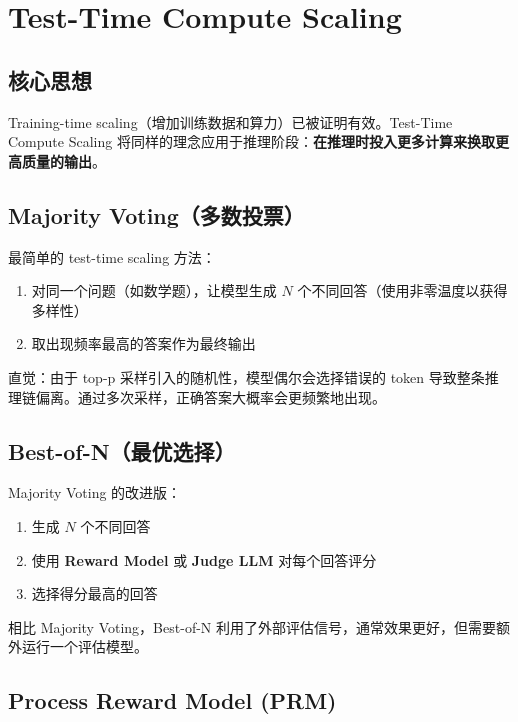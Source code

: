 \section{Test-Time Compute Scaling}

\subsection{核心思想}

Training-time scaling（增加训练数据和算力）已被证明有效。Test-Time Compute Scaling 将同样的理念应用于推理阶段：\textbf{在推理时投入更多计算来换取更高质量的输出}。

\subsection{Majority Voting（多数投票）}

最简单的 test-time scaling 方法：

\begin{enumerate}
    \item 对同一个问题（如数学题），让模型生成 $N$ 个不同回答（使用非零温度以获得多样性）
    \item 取出现频率最高的答案作为最终输出
\end{enumerate}

直觉：由于 top-p 采样引入的随机性，模型偶尔会选择错误的 token 导致整条推理链偏离。通过多次采样，正确答案大概率会更频繁地出现。

\subsection{Best-of-N（最优选择）}

Majority Voting 的改进版：

\begin{enumerate}
    \item 生成 $N$ 个不同回答
    \item 使用 \textbf{Reward Model} 或 \textbf{Judge LLM} 对每个回答评分
    \item 选择得分最高的回答
\end{enumerate}

相比 Majority Voting，Best-of-N 利用了外部评估信号，通常效果更好，但需要额外运行一个评估模型。

\subsection{Process Reward Model (PRM)}


